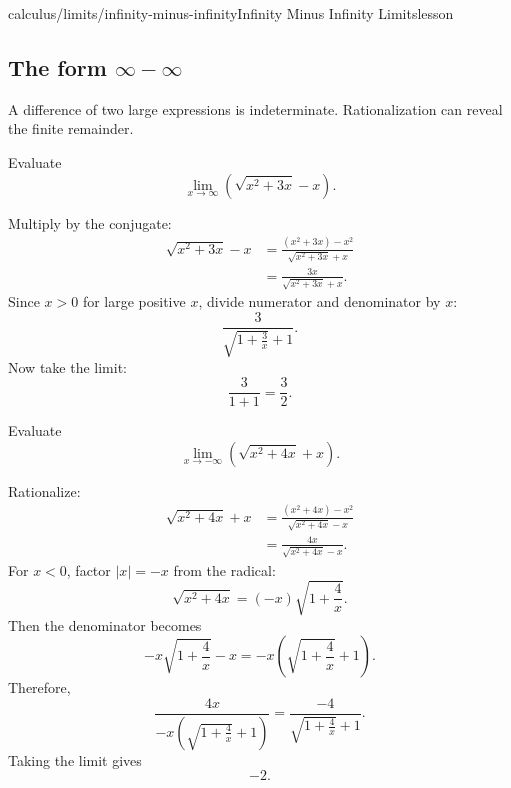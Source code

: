 \begin{webpage}{calculus/limits/infinity-minus-infinity}{Infinity Minus Infinity Limits}{lesson}
\subsection{The form \(\infty-\infty\)}

A difference of two large expressions is indeterminate. Rationalization can reveal the finite remainder.

\begin{bgexample}[title={Rationalize at infinity}]
Evaluate
\[
  \lim_{x\to\infty}\left(\sqrt{x^2+3x}-x\right).
\]

\begin{bgsolution}
Multiply by the conjugate:
\begin{align*}
\sqrt{x^2+3x}-x
&=\frac{(x^2+3x)-x^2}{\sqrt{x^2+3x}+x}\\
&=\frac{3x}{\sqrt{x^2+3x}+x}.
\end{align*}
Since \(x>0\) for large positive \(x\), divide numerator and denominator by \(x\):
\[
  \frac3{\sqrt{1+\frac3x}+1}.
\]
Now take the limit:
\[
  \frac3{1+1}=\boxed{\frac32}.
\]
\end{bgsolution}
\end{bgexample}

\begin{bgexample}[title={Exam-level: negative infinity changes the conjugate calculation}]
Evaluate
\[
  \lim_{x\to-\infty}\left(\sqrt{x^2+4x}+x\right).
\]

\begin{bgsolution}
Rationalize:
\begin{align*}
\sqrt{x^2+4x}+x
&=\frac{(x^2+4x)-x^2}{\sqrt{x^2+4x}-x}\\
&=\frac{4x}{\sqrt{x^2+4x}-x}.
\end{align*}
For \(x<0\), factor \(|x|=-x\) from the radical:
\[
  \sqrt{x^2+4x}=(-x)\sqrt{1+\frac4x}.
\]
Then the denominator becomes
\[
  -x\sqrt{1+\frac4x}-x
  =-x\left(\sqrt{1+\frac4x}+1\right).
\]
Therefore,
\[
  \frac{4x}{-x\left(\sqrt{1+\frac4x}+1\right)}
  =\frac{-4}{\sqrt{1+\frac4x}+1}.
\]
Taking the limit gives
\[
  \boxed{-2}.
\]
\end{bgsolution}
\end{bgexample}
\end{webpage}

